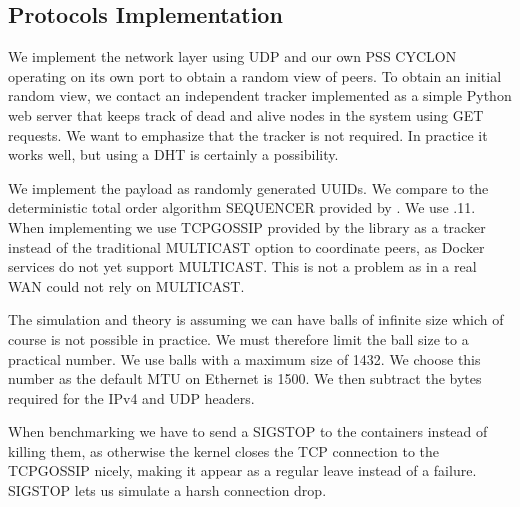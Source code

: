 \subsection{Protocols Implementation}
We implement the network layer using UDP and our own PSS CYCLON operating on its own port to obtain a random view of peers. To obtain an initial random view, we contact an independent tracker implemented as a simple Python web server that keeps track of dead and alive nodes in the system using GET requests. We want to emphasize that the tracker is not required. In practice it works well, but using a DHT is certainly a possibility.

We implement the payload as randomly generated UUIDs. We compare \epto to the deterministic total order algorithm SEQUENCER provided by \jgroups. We use .11. When implementing \jgroups we use TCPGOSSIP \autocite{tcpgossip} provided by the \jgroups library as a tracker instead of the traditional MULTICAST option to coordinate peers, as Docker services do not yet support MULTICAST. This is not a problem as in a real WAN \jgroups could not rely on MULTICAST.

The \epto simulation and theory is assuming we can have balls of infinite size which of course is not possible in practice.
We must therefore limit the ball size to a practical number. We use balls with a maximum size of \SI{1432}{\byte}. We choose this number as the default MTU on Ethernet is \SI{1500}{\byte}. We then subtract the bytes required for the IPv4 and UDP headers.

When benchmarking \jgroups we have to send a SIGSTOP to the containers instead of killing them, as otherwise the kernel closes the TCP connection to the TCPGOSSIP nicely, making it appear as a regular leave instead of a failure. SIGSTOP lets us simulate a harsh connection drop.
